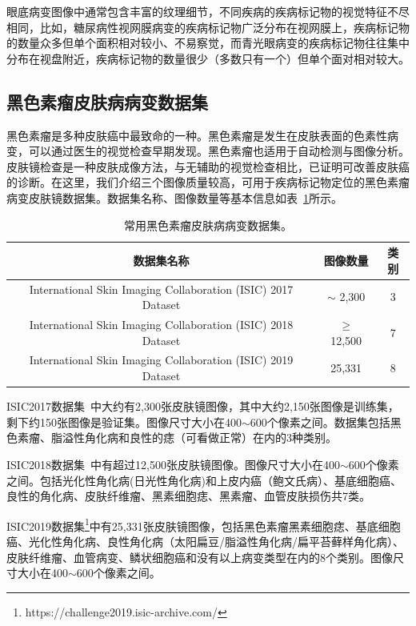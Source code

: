 眼底病变图像中通常包含丰富的纹理细节，不同疾病的疾病标记物的视觉特征不尽相同，比如，糖尿病性视网膜病变的疾病标记物广泛分布在视网膜上，疾病标记物的数量众多但单个面积相对较小、不易察觉，而青光眼病变的疾病标记物往往集中分布在视盘附近，疾病标记物的数量很少（多数只有一个）但单个面对相对较大。

\subsection{黑色素瘤皮肤病病变数据集}\label{subsec:original_dermatoscope_ds_intro}
黑色素瘤是多种皮肤癌中最致命的一种。黑色素瘤是发生在皮肤表面的色素性病变，可以通过医生的视觉检查早期发现。黑色素瘤也适用于自动检测与图像分析。皮肤镜检查是一种皮肤成像方法，与无辅助的视觉检查相比，已证明可改善皮肤癌的诊断。在这里，我们介绍三个图像质量较高，可用于疾病标记物定位的黑色素瘤病变皮肤镜数据集。数据集名称、图像数量等基本信息如表~\ref{tab:skin_datasets_info}所示。

\begin{table}[h]
	\centering
	\caption[常用黑色素瘤皮肤病病变数据集]{常用黑色素瘤皮肤病病变数据集。}
	\label{tab:skin_datasets_info}
	\begin{tabular}{c|c|c}
		\toprule[2pt]
		数据集名称 & 图像数量 & 类别 \\
		\midrule[2pt]
		International Skin Imaging Collaboration (ISIC) 2017 Dataset &  $\sim$ 2,300 & 3  \\ \hline
		International Skin Imaging Collaboration (ISIC) 2018 Dataset & $\geq$ 12,500 & 7  \\ \hline
		International Skin Imaging Collaboration (ISIC) 2019 Dataset& 25,331 & 8    \\ 
		\bottomrule[2pt]
	\end{tabular}
\end{table}

ISIC2017数据集~\cite{codella2018skin}中大约有2,300张皮肤镜图像，其中大约2,150张图像是训练集，剩下约150张图像是验证集。图像尺寸大小在400$\sim $600个像素之间。数据集包括黑色素瘤、脂溢性角化病和良性的痣（可看做正常）在内的3种类别。

ISIC2018数据集~\cite{codella2019skin, tschandl2018ham10000}中有超过12,500张皮肤镜图像。图像尺寸大小在400$\sim $600个像素之间。包括光化性角化病(日光性角化病)和上皮内癌（鲍文氏病）、基底细胞癌、良性的角化病、皮肤纤维瘤、黑素细胞痣、黑素瘤、血管皮肤损伤共7类。

ISIC2019数据集\footnote{https://challenge2019.isic-archive.com/}中有25,331张皮肤镜图像，包括黑色素瘤黑素细胞痣、基底细胞癌、光化性角化病、良性角化病（太阳扁豆/脂溢性角化病/扁平苔藓样角化病）、皮肤纤维瘤、血管病变、鳞状细胞癌和没有以上病变类型在内的8个类别。图像尺寸大小在400$\sim $600个像素之间。

